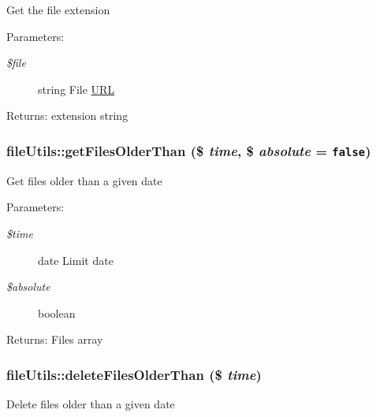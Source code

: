 Get the file extension

\begin{Desc}
\item[Parameters:]
\begin{description}
\item[{\em \$file}]string File \hyperlink{classURL}{URL} \end{description}
\end{Desc}
\begin{Desc}
\item[Returns:]extension string \end{Desc}
\hypertarget{classfileUtils_d43043653535fb2f0ef0b95bddc46f5a}{
\subsubsection[getFilesOlderThan]{\setlength{\rightskip}{0pt plus 5cm}fileUtils::getFilesOlderThan (\$ {\em time}, \/  \$ {\em absolute} = {\tt false})}}
\label{classfileUtils_d43043653535fb2f0ef0b95bddc46f5a}


Get files older than a given date

\begin{Desc}
\item[Parameters:]
\begin{description}
\item[{\em \$time}]date Limit date \item[{\em \$absolute}]boolean \end{description}
\end{Desc}
\begin{Desc}
\item[Returns:]Files array \end{Desc}
\hypertarget{classfileUtils_f1e8a8b4cb39d0b9fa3244307d12601b}{
\subsubsection[deleteFilesOlderThan]{\setlength{\rightskip}{0pt plus 5cm}fileUtils::deleteFilesOlderThan (\$ {\em time})}}
\label{classfileUtils_f1e8a8b4cb39d0b9fa3244307d12601b}


Delete files older than a given date

